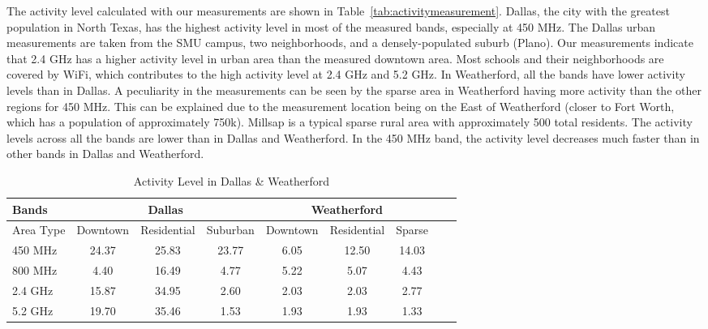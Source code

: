 The activity level calculated with our measurements are shown in Table~\ref{tab:activitymeasurement}.
Dallas, the city with the greatest population in North Texas, has the highest activity level in most 
of the measured bands, especially at 450 MHz. The Dallas urban measurements are taken from the SMU 
campus, two neighborhoods, and a densely-populated suburb (Plano). Our measurements indicate that 2.4 GHz 
has a higher activity level in urban area than the measured downtown area. Most schools and their 
neighborhoods are covered by WiFi, which contributes to the high activity level at 2.4 GHz and 5.2 GHz.
In Weatherford, all the bands have lower activity levels than in Dallas. A peculiarity in the measurements
can be seen by the sparse area in Weatherford having more activity than the other regions for 450 MHz.  
This can be explained due to the measurement location being on the East of Weatherford (closer to Fort Worth,
which has a population of approximately 750k).
Millsap is a typical sparse rural area with approximately 500 total residents. The activity levels across 
all the bands are lower than in Dallas and Weatherford. In the 450 MHz band, the activity level decreases 
much faster than in other bands in Dallas and Weatherford. 

\begin{table}
\centering %
\begin{tabular}{|l|c|c|c|c|c|c|c|c|} %
\hline %
Bands     & \multicolumn{3}{c|}{Dallas} & \multicolumn{3}{c|}{Weatherford} \\%
\hline %
Area Type & Downtown & Residential & Suburban & Downtown &  Residential & Sparse \\ %
\hline %
450 MHz &24.37	&25.83  &23.77	&6.05 &12.50  &14.03  \\      
\hline %
800 MHz &4.40 	&16.49  &4.77	&5.22&5.07 &4.43   \\      
\hline %
2.4 GHz &15.87 	&34.95  &2.60	&2.03&2.03 &2.77   \\      
\hline %
5.2 GHz &19.70	&35.46  &1.53	&1.93&1.93 &1.33   \\      
\hline %
\end{tabular}    
\caption{Activity Level in Dallas \& Weatherford} %
\label{tab:activitymeasurement_d_w}    
\vspace{-0.1in}
\end{table}    

